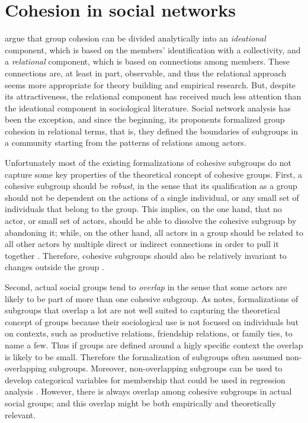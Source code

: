 \section{Cohesion in social networks}

\citet{doreian:1998} argue that group cohesion can be divided analytically into an \emph{ideational} component, which is based on the members' identification with a collectivity, and a \emph{relational} component, which is based on connections among members. These connections are, at least in part, observable, and thus the relational approach seems more appropriate for theory building and empirical research. But, despite its attractiveness, the relational component has received much less attention than the ideational component in sociological literature. Social network analysis has been the exception, and since the beginning, its proponents formalized group cohesion in relational terms, that is, they defined the boundaries of subgroups in a community starting from the patterns of relations among actors.

Unfortunately most of the existing formalizations of cohesive subgroups do not capture some key properties of the theoretical concept of cohesive groups. First, a cohesive subgroup should be \emph{robust}, in the sense that its qualification as a group should not be dependent on the actions of a single individual, or any small set of individuals that belong to the group. This implies, on the one hand, that no actor, or small set of actors, should be able to dissolve the cohesive subgroup by abandoning it; while, on the other hand, all actors in a group should be related to all other actors by multiple direct or indirect connections in order to pull it together \citep{white:2001,moody:2003}. Therefore, cohesive subgroups should also be relatively invariant to changes outside the group \citep[chapter 6]{brandes:2005}.

Second, actual social groups tend to  \emph{overlap} in the sense that some actors are likely to be part of more than one cohesive subgroup. As \citet{freeman:1992} notes, formalizations of subgroups that overlap a lot are not well suited to capturing the theoretical concept of groups because their sociological use is not focused on individuals but on contexts, such as productive relations, friendship relations, or family ties, to name a few. Thus if groups are defined around a higly specific context the overlap is likely to be small. Therefore the formalization of subgroups often assumed non-overlapping subgroups. Moreover, non-overlapping subgroups can be used to develop categorical variables for membership that could be used in regression analysis \citep{borgatti:1990}. However, there is always overlap among cohesive subgroups in actual social groups; and this overlap might be both empirically and theoretically relevant.

